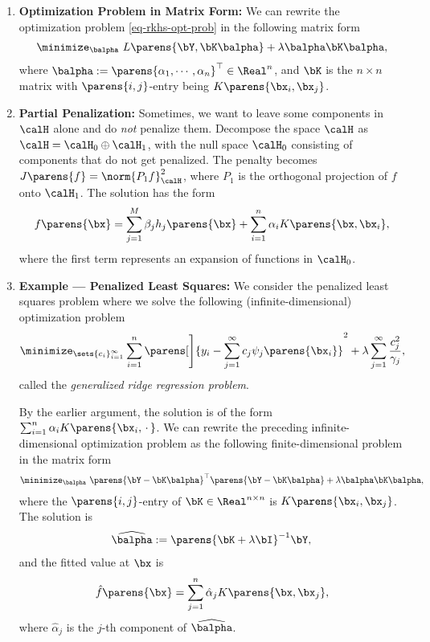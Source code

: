 \documentclass[12pt]{article}
\begin{document}
\begin{enumerate}[label=\textbf{\arabic*.}]
	\item \textbf{Optimization Problem in Matrix Form:} We can rewrite the optimization problem \eqref{eq-rkhs-opt-prob} in the following matrix form 
	\begin{align*}
		\minimize_{\balpha} \ L \parens{\bY, \bK \balpha} + \lambda \balpha \bK \balpha, 
	\end{align*}
	where $\balpha := \parens{\alpha_1, \cdots, \alpha_n}^\top \in \Real^n$, and $\bK$ is the $n \times n$ matrix with $\parens{i, j}$-entry being $K \parens{\bx_i, \bx_j}$. 
	
	\item \textbf{Partial Penalization:} Sometimes, we want to leave some components in $\calH$ alone and do \emph{not} penalize them. Decompose the space $\calH$ as $\calH = \calH_0 \oplus \calH_1$, with the null space $\calH_0$ consisting of components that do not get penalized. The penalty becomes $J \parens{f} = \norm{P_1f}_{\calH}^2$, where $P_1$ is the orthogonal projection of $f$ onto $\calH_1$. The solution has the form 
	\begin{align*}
		f \parens{\bx} = \sum_{j=1}^M \beta_j h_j \parens{\bx} + \sum_{i=1}^n \alpha_i K \parens{\bx, \bx_i}, 
	\end{align*}
	where the first term represents an expansion of functions in $\calH_0$. 
	
	\item \textbf{Example --- Penalized Least Squares:} We consider the penalized least squares problem where we solve the following (infinite-dimensional) optimization problem 
	\begin{align*}
		\minimize_{\sets{c_i}_{i=1}^\infty} \sum_{i=1}^n \parens[\Bigg]{y_i - \sum_{j=1}^\infty c_j \psi_j \parens{\bx_i}}^2 + \lambda \sum_{j=1}^\infty \frac{c_j^2}{\gamma_j}, 
	\end{align*}
	called the \emph{generalized ridge regression problem}. 
	
	By the earlier argument, the solution is of the form $\sum_{i=1}^n \alpha_i K \parens{\bx_i, \,\cdot\,}$. We can rewrite the preceding infinite-dimensional optimization problem as the following finite-dimensional problem in the matrix form 
	\begin{align*}
		\minimize_{\balpha} \ \parens{\bY - \bK \balpha}^\top \parens{\bY - \bK \balpha} + \lambda \balpha \bK \balpha, 
	\end{align*}
	where the $\parens{i, j}$-entry of $\bK \in \Real^{n \times n}$ is $K \parens{\bx_i, \bx_j}$. 
	The solution is 
	\begin{align*}
		\widehat{\balpha} := \parens{\bK + \lambda \bI}^{-1} \bY, 
	\end{align*}
	and the fitted value at $\bx$ is
	\begin{align*}
		\hat{f} \parens{\bx} = \sum_{j=1}^n \hat{\alpha}_j K \parens{\bx, \bx_j}, 
	\end{align*}
	where $\hat{\alpha}_j$ is the $j$-th component of $\widehat{\balpha}$. 
	

\end{enumerate}
\end{document}
